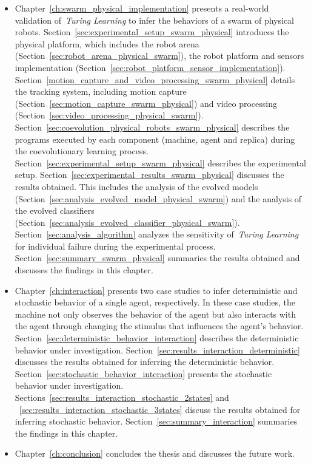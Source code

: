 \begin{itemize}
\item Chapter~\ref{ch:swarm_physical_implementation} presents a real-world validation of~\textit{Turing Learning} to infer the behaviors of a swarm of physical robots. Section~\ref{sec:experimental_setup_swarm_physical} introduces the physical platform, which includes the robot arena (Section~\ref{sec:robot_arena_physical_swarm}), the robot platform and sensors implementation (Section~\ref{sec:robot_platform_sensor_implementation}). Section~\ref{motion_capture_and_video_processing_swarm_physical} details the tracking system, including motion capture (Section~\ref{sec:motion_capture_swarm_physical}) and video processing (Section~\ref{sec:video_processing_physical_swarm}). Section~\ref{sec:coevolution_physical_robots_swarm_physical} describes the programs executed by each component (machine, agent and replica) during the coevolutionary learning process. Section~\ref{sec:experimental_setup_swarm_physical} describes the experimental setup. Section~\ref{sec:experimental_results_swarm_physical} discusses the results obtained. This includes the analysis of the evolved models (Section~\ref{sec:analysis_evolved_model_physical_swarm}) and the analysis of the evolved classifiers (Section~\ref{sec:analysis_evolved_classifier_physical_swarm}). Section~\ref{sec:analysis_algorithm} analyzes the sensitivity of~\textit{Turing Learning} for individual failure during the experimental process. Section~\ref{sec:summary_swarm_physical} summaries the results obtained and discusses the findings in this chapter.

\item Chapter~\ref{ch:interaction} presents two case studies to infer deterministic and stochastic behavior of a single agent, respectively. In these case studies, the machine not only observes the behavior of the agent but also interacts with the agent through changing the stimulus that influences the agent's behavior. Section~\ref{sec:deterministic_behavior_interaction} describes the deterministic behavior under investigation. Section~\ref{sec:results_interaction_deterministic} discusses the results obtained for inferring the deterministic behavior. Section~\ref{sec:stochastic_behavior_interaction} presents the stochastic behavior under investigation. Sections~\ref{sec:results_interaction_stochastic_2states} and ~\ref{sec:results_interaction_stochastic_3states} discuss the results obtained for inferring stochastic behavior. Section~\ref{sec:summary_interaction} summaries the findings in this chapter.

\item Chapter~\ref{ch:conclusion} concludes the thesis and discusses the future work. 

\end{itemize}
